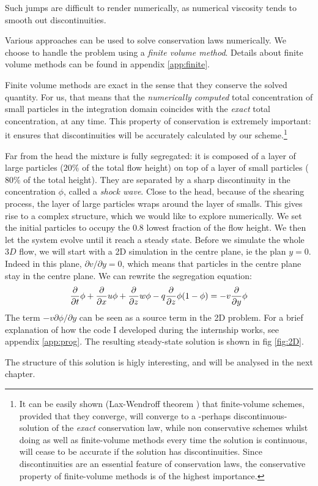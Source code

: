 Such jumps are difficult to render numerically, as numerical viscosity tends to smooth out discontinuities.

Various approaches can be used to solve conservation laws numerically. We choose to handle the problem using a \textit{finite volume method}. Details about finite volume methods can be found in appendix \ref{app:finite}.

Finite volume methods are exact in the sense that they conserve the solved quantity.
For us, that means that the \textit{numerically computed} total concentration of small particles in the integration domain coincides with the \textit{exact} total concentration, at any time.
This property of conservation is extremely important: it ensures that discontinuities will be accurately calculated by our scheme.\footnote{It can be easily shown (Lax-Wendroff theorem \cite{laxwendroff}) that finite-volume schemes, provided that they converge, will converge to a -perhaps discontinuous- solution of the \textit{exact} conservation law, while non conservative schemes whilst doing as well as finite-volume methods every time the solution is continuous, will cease to be accurate if the solution has discontinuities. Since discontinuities are an essential feature of conservation laws, the conservative property of finite-volume methods is of the highest importance.} 

Far from the head the mixture is fully segregated: it is composed of a layer of large particles ($20 \%$ of the total flow height) on top of a layer of small particles ($80 \%$ of the total height). They are separated by a sharp discontinuity in the concentration $\phi$, called a \textit{shock wave}.
Close to the head, because of the shearing process, the layer of large particles wraps around the layer of smalls. This gives rise to a complex structure, which we would like to explore numerically. 
We set the initial particles to occupy the $0.8$ lowest fraction of the flow height. We then let the system evolve until it reach a steady state. 
Before we simulate the whole $3D$ flow, we will start
with a 2D simulation in the centre plane, ie the plan $y=0$.
  Indeed in this plane, $ \partial v / \partial y = 0$, 
  which means that particles in the centre plane stay in the centre plane. We can rewrite the segregation equation:
\begin{equation}
	\frac{\partial {}}{\partial {t}} \phi + \frac{\partial {}}{\partial {x}} u \phi + \frac{\partial {}}{\partial {z}} w \phi - q \frac{\partial {}}{\partial {z}} \phi( 1 - \phi) = - v \frac{\partial {}}{\partial {y}} \phi
\end{equation}
The term $ - v \partial \phi / \partial y$ can be seen as a source term in the 2D problem.
For a brief explanation of how the code I developed during the internship works, see appendix \ref{app:prog}.
The resulting steady-state solution is shown in fig \ref{fig:2D}.

The structure of this solution is higly interesting, and will be analysed in the next chapter.
